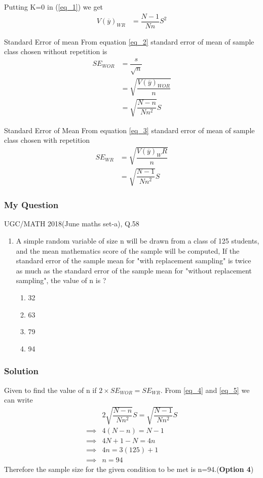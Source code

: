 \documentclass{beamer}
\begin{document}
\begin{frame}
Putting K=0 in (\ref{eq_1}) we get 
\begin{align}
V(\overline{y})_{WR} & = \dfrac{N-1}{Nn} S^2\label{eq_3}
\end{align}
\begin{block}{Standard Error of mean }
From equation \eqref{eq_2}  standard error of mean of sample class chosen  without repetition is
\begin{align}
{SE}_{WOR} & = \dfrac{s}{\sqrt{n}}\\
& = \sqrt{\dfrac{V(\overline{y})_{WOR}}{n}}\\
& = \sqrt{\dfrac{N-n}{Nn^2}}S \label{eq_4}
\end{align} 
\end{block}
\end{frame}

\begin{frame}
\begin{block}{Standard Error of Mean}
From equation \eqref{eq_3}  standard error of mean of sample class chosen with repetition
\begin{align}
{SE}_{WR} & = \sqrt{\dfrac{V(\overline{y})_WR}{n}}\\
& = \sqrt{\dfrac{N-1}{Nn^2}}S \label{eq_5}
\end{align}
\end{block}
\end{frame}

\begin{frame}
\frametitle{My Question}
\begin{block}{UGC/MATH 2018(June maths set-a), Q.58}
\begin{enumerate}
\item A simple random variable of size n will be drawn from a class of 125 students, and the mean mathematics score of the sample will be computed, If the standard error of the sample mean for "with replacement sampling" is twice as much as the standard error of the sample mean for "without replacement sampling", the value of n is ? 
	\begin{enumerate}
	\item 32
	\item 63
	\item 79
	\item 94
	\end{enumerate}
\end{enumerate}
\end{block}
\end{frame}

\begin{frame}
\frametitle{Solution}
Given to find the value of n if $2 \times {SE}_{WOR} =  {SE}_{WR}$.
From \eqref{eq_4} and \eqref{eq_5} we can write 
\begin{align*}
& 2\sqrt{\dfrac{N-n}{Nn^2}}S= \sqrt{\dfrac{N-1}{Nn^2}}S\\
\implies & 4(N-n) = N-1\\
\implies & 4N+1-N=4n\\
\implies & 4n=3(125)+1\\
\implies & n=94
\end{align*}
Therefore the sample size for the given condition to be met is n=94.(\textbf{Option 4})
\end{frame}
\end{document}
